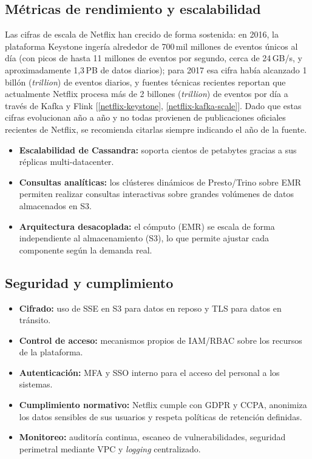\documentclass[12pt,a4paper]{article}
\begin{document}
\subsection{Métricas de rendimiento y escalabilidad}
Las cifras de escala de Netflix han crecido de forma sostenida: en 2016, la
plataforma Keystone ingería alrededor de 700\,mil millones de eventos únicos
al día (con picos de hasta 11 millones de eventos por segundo, cerca de
24\,GB/s, y aproximadamente 1,3\,PB de datos diarios); para 2017 esa cifra
había alcanzado 1 billón (\textit{trillion}) de eventos diarios, y fuentes
técnicas recientes reportan que actualmente Netflix procesa más de 2 billones
(\textit{trillion}) de eventos por día a través de Kafka y Flink
[\ref{netflix-keystone}, \ref{netflix-kafka-scale}]. Dado que estas cifras evolucionan
año a año y no todas provienen de publicaciones oficiales recientes de
Netflix, se recomienda citarlas siempre indicando el año de la fuente.
\begin{itemize}
    \item \textbf{Escalabilidad de Cassandra:} soporta cientos de petabytes gracias a sus réplicas multi-datacenter.
    \item \textbf{Consultas analíticas:} los clústeres dinámicos de Presto/Trino sobre EMR permiten realizar consultas interactivas sobre grandes volúmenes de datos almacenados en S3.
    \item \textbf{Arquitectura desacoplada:} el cómputo (EMR) se escala de forma independiente al almacenamiento (S3), lo que permite ajustar cada componente según la demanda real.
\end{itemize}

\subsection{Seguridad y cumplimiento}
\begin{itemize}
    \item \textbf{Cifrado:} uso de SSE en S3 para datos en reposo y TLS para datos en tránsito.
    \item \textbf{Control de acceso:} mecanismos propios de IAM/RBAC sobre los recursos de la plataforma.
    \item \textbf{Autenticación:} MFA y SSO interno para el acceso del personal a los sistemas.
    \item \textbf{Cumplimiento normativo:} Netflix cumple con GDPR y CCPA, anonimiza los datos sensibles de sus usuarios y respeta políticas de retención definidas.
    \item \textbf{Monitoreo:} auditoría continua, escaneo de vulnerabilidades, seguridad perimetral mediante VPC y \textit{logging} centralizado.
\end{itemize}
\end{document}
